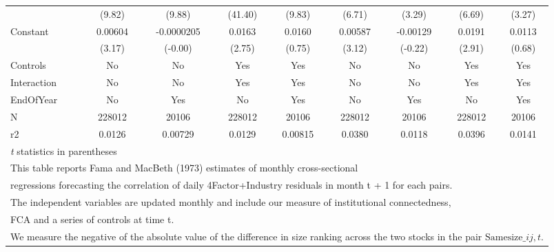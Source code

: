 {\begin{tabular}{l*{8}{c}}
                &   (9.82)         &   (9.88)         &  (41.40)         &   (9.83)         &   (6.71)         &   (3.29)         &   (6.69)         &   (3.27)         \\
[1em]
Constant        &  0.00604\sym{**} &-0.0000205         &   0.0163\sym{**} &   0.0160         &  0.00587\sym{**} & -0.00129         &   0.0191\sym{**} &   0.0113         \\
                &   (3.17)         &  (-0.00)         &   (2.75)         &   (0.75)         &   (3.12)         &  (-0.22)         &   (2.91)         &   (0.68)         \\
\hline
Controls        &       No         &       No         &      Yes         &      Yes         &       No         &       No         &      Yes         &      Yes         \\
Interaction     &       No         &       No         &      Yes         &      Yes         &       No         &       No         &      Yes         &      Yes         \\
EndOfYear       &       No         &      Yes         &       No         &      Yes         &       No         &      Yes         &       No         &      Yes         \\
N               &   228012         &    20106         &   228012         &    20106         &   228012         &    20106         &   228012         &    20106         \\
r2              &   0.0126         &  0.00729         &   0.0129         &  0.00815         &   0.0380         &   0.0118         &   0.0396         &   0.0141         \\
\hline\hline
\multicolumn{9}{l}{\footnotesize \textit{t} statistics in parentheses}\\
\multicolumn{9}{l}{\footnotesize This table reports Fama and MacBeth (1973) estimates of monthly cross-sectional}\\
\multicolumn{9}{l}{\footnotesize  regressions forecasting the correlation of daily 4Factor+Industry residuals in month t + 1 for each pairs.}\\
\multicolumn{9}{l}{\footnotesize The independent variables are updated monthly and include our measure of institutional connectedness,}\\
\multicolumn{9}{l}{\footnotesize  FCA and a series of controls at time t.}\\
\multicolumn{9}{l}{\footnotesize We measure the negative of the absolute value of the difference in size ranking across the two stocks in the pair $ \text{Samesize}\_{ij,t} $.}\\

\end{tabular}}
